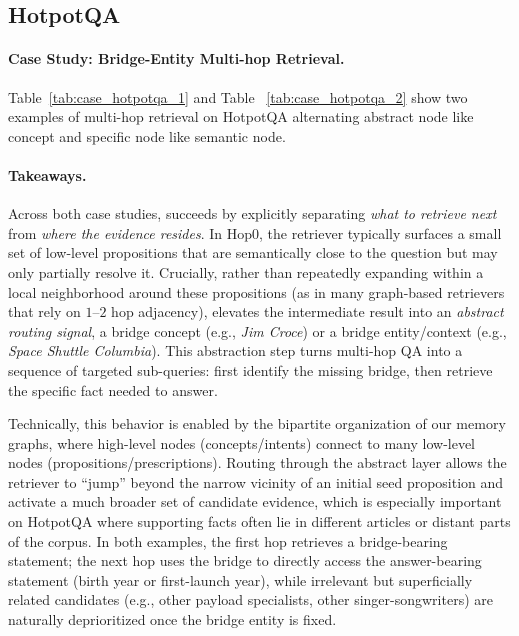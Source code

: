 \subsection{HotpotQA}
\paragraph{Case Study: Bridge-Entity Multi-hop Retrieval.}
Table~\ref{tab:case_hotpotqa_1} and Table ~\ref{tab:case_hotpotqa_2} show two examples of multi-hop retrieval on HotpotQA alternating abstract node like concept and specific node like semantic node. 





\paragraph{Takeaways. } 
Across both case studies, \plugmem succeeds by explicitly separating \emph{what to retrieve next} from \emph{where the evidence resides}. In Hop0, the retriever typically surfaces a small set of low-level propositions that are semantically close to the question but may only partially resolve it. Crucially, rather than repeatedly expanding within a local neighborhood around these propositions (as in many graph-based retrievers that rely on $1$--$2$ hop adjacency), \plugmem elevates the intermediate result into an \emph{abstract routing signal}, a bridge concept (e.g., \emph{Jim Croce}) or a bridge entity/context (e.g., \emph{Space Shuttle Columbia}). This abstraction step turns multi-hop QA into a sequence of targeted sub-queries: first identify the missing bridge, then retrieve the specific fact needed to answer. 


Technically, this behavior is enabled by the bipartite organization of our memory graphs, where high-level nodes (concepts/intents) connect to many low-level nodes (propositions/prescriptions).
Routing through the abstract layer allows the retriever to ``jump'' beyond the narrow vicinity of an initial seed proposition and activate a much broader set of candidate evidence, which is especially important on HotpotQA where supporting facts often lie in different articles or distant parts of the corpus. In both examples, the first hop retrieves a bridge-bearing statement; the next hop uses the bridge to directly access the answer-bearing statement (birth year or first-launch year), while irrelevant but superficially related candidates (e.g., other payload specialists, other singer-songwriters) are naturally deprioritized once the bridge entity is fixed.


